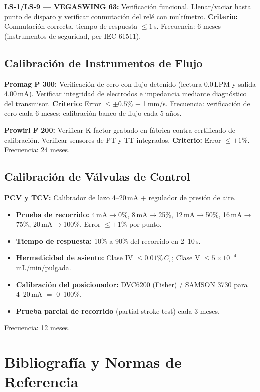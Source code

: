 \documentclass[12pt,letterpaper]{article}
\begin{document}
\textbf{LS-1/LS-9 — VEGASWING 63:} Verificación funcional. Llenar/vaciar hasta punto de disparo y verificar conmutación del relé con multímetro. \textbf{Criterio:} Conmutación correcta, tiempo de respuesta $\leq1\,$s. Frecuencia: 6 meses (instrumentos de seguridad, per IEC 61511).

\subsection{Calibración de Instrumentos de Flujo}

\textbf{Promag P 300:} Verificación de cero con flujo detenido (lectura 0.0\,LPM y salida 4.00\,mA). Verificar integridad de electrodos e impedancia mediante diagnóstico del transmisor. \textbf{Criterio:} Error $\leq\pm0.5\%$ + 1\,mm/s. Frecuencia: verificación de cero cada 6 meses; calibración banco de flujo cada 5 años.

\textbf{Prowirl F 200:} Verificar K-factor grabado en fábrica contra certificado de calibración. Verificar sensores de PT y TT integrados. \textbf{Criterio:} Error $\leq\pm1\%$. Frecuencia: 24 meses.

\subsection{Calibración de Válvulas de Control}

\textbf{PCV y TCV:} Calibrador de lazo 4--20\,mA + regulador de presión de aire.
\begin{itemize}
  \item \textbf{Prueba de recorrido:} 4\,mA$\to$0\%, 8\,mA$\to$25\%, 12\,mA$\to$50\%, 16\,mA$\to$75\%, 20\,mA$\to$100\%. Error $\leq\pm1\%$ por punto.
  \item \textbf{Tiempo de respuesta:} 10\% a 90\% del recorrido en 2--10\,s.
  \item \textbf{Hermeticidad de asiento:} Clase IV $\leq0.01\%\,C_v$; Clase V $\leq5\times10^{-4}$\,mL/min/pulgada.
  \item \textbf{Calibración del posicionador:} DVC6200 (Fisher) / SAMSON 3730 para 4--20\,mA $=$ 0--100\%.
  \item \textbf{Prueba parcial de recorrido} (partial stroke test) cada 3 meses.
\end{itemize}
Frecuencia: 12 meses.

\section{Bibliografía y Normas de Referencia}
\end{document}
